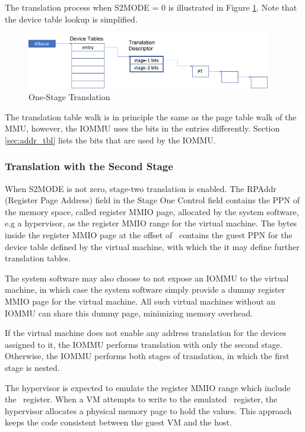 The translation process when S2MODE = 0 is illustrated in Figure \ref{fig:one-stage-trans}.
Note that the device table lookup is simplified.

\begin{figure}[ht!]
    \centering
    \includegraphics[width=0.95\textwidth]{img/one-stage-trans.pdf}
    \caption{One-Stage Translation}
    \label{fig:one-stage-trans}
\end{figure}

The translation table walk is in principle the same as the page table walk of the MMU,
however, the IOMMU uses the bits in the entries differently. Section \ref{sec:addr_tbl}
lists the bits that are used by the IOMMU.

\subsubsection{Translation with the Second Stage}

When S2MODE is not zero, stage-two translation is enabled. The RPAddr (Register Page
Address) field in the Stage One Control field contains the PPN of the memory space, called
register MMIO page, allocated by the system software, e.g a hypervisor, as the register
MMIO range for the virtual machine. The bytes inside the register MMIO page at the offset
of \dtbase\ contains the guest PPN for the device table defined by the virtual machine,
with which the it may define further translation tables.

\note The system software may also choose to not expose an IOMMU to the virtual machine,
in which case the system software simply provide a dummy register MMIO page for the
virtual machine. All such virtual machines without an IOMMU can share this dummy page,
minimizing memory overhead. \noteend

If the virtual machine does not enable any address translation for the devices assigned to
it, the IOMMU performs translation with only the second stage. Otherwise, the IOMMU
performs both stages of translation, in which the first stage is nested.

The hypervisor is expected to emulate the register MMIO range which include the
\dtbase\ register. When a VM attempts to write to the emulated \dtbase\
register, the hypervisor allocates a physical memory page to hold the values. This
approach keeps the code consistent between the guest VM and the host. 

